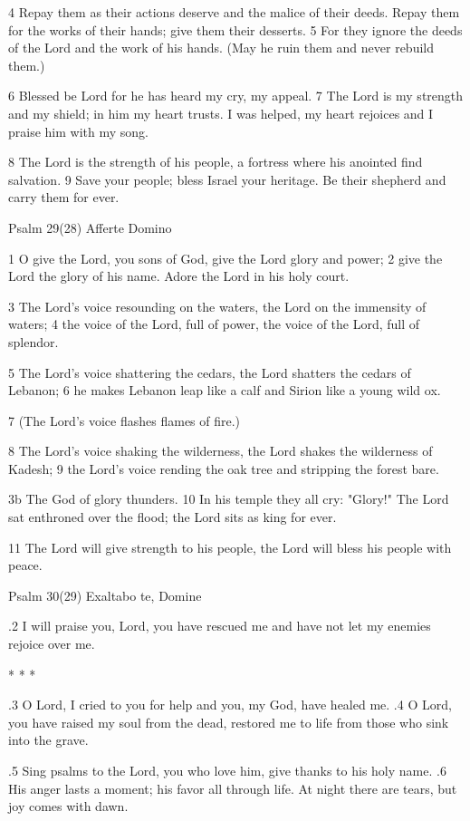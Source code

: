 4 Repay them as their actions deserve
and the malice of their deeds.
Repay them for the works of their hands;
give them their desserts.
5 For they ignore the deeds of the Lord
and the work of his hands.
(May he ruin them and never rebuild them.)

6 Blessed be Lord for he has heard
my cry, my appeal.
7 The Lord is my strength and my shield;
in him my heart trusts.
I was helped, my heart rejoices
and I praise him with my song.

8 The Lord is the strength of his people,
a fortress where his anointed find salvation.
9 Save your people; bless Israel your heritage.
Be their shepherd and carry them for ever.


Psalm 29(28) Afferte Domino

1 O give the Lord, you sons of God,
give the Lord glory and power;
2 give the Lord the glory of his name.
Adore the Lord in his holy court.

3 The Lord's voice resounding on the waters,
the Lord on the immensity of waters;
4 the voice of the Lord, full of power,
the voice of the Lord, full of splendor.

5 The Lord's voice shattering the cedars,
the Lord shatters the cedars of Lebanon;
6 he makes Lebanon leap like a calf
and Sirion like a young wild ox.

7 (The Lord's voice flashes flames of fire.)

8 The Lord's voice shaking the wilderness,
the Lord shakes the wilderness of Kadesh;
9 the Lord's voice rending the oak tree
and stripping the forest bare.

3b The God of glory thunders.
10 In his temple they all cry: "Glory!"
The Lord sat enthroned over the flood;
the Lord sits as king for ever.

11 The Lord will give strength to his people,
the Lord will bless his people with peace.



Psalm 30(29) Exaltabo te, Domine

.2 I will praise you, Lord, you have rescued me
and have not let my enemies rejoice over me.

* * *

.3 O Lord, I cried to you for help
and you, my God, have healed me.
.4 O Lord, you have raised my soul from the dead,
restored me to life from those who sink into the grave.

.5 Sing psalms to the Lord, you who love him,
give thanks to his holy name.
.6 His anger lasts a moment; his favor all through life.
At night there are tears, but joy comes with dawn.

